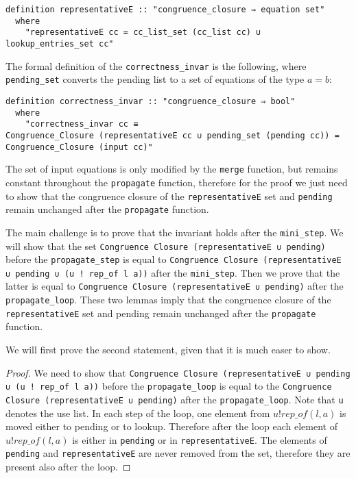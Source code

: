 \begin{lstlisting}
definition representativeE :: "congruence_closure ⇒ equation set"
  where
    "representativeE cc = cc_list_set (cc_list cc) ∪ lookup_entries_set cc"
\end{lstlisting}

The formal definition of the \lstinline|correctness_invar| is the following, where \lstinline{pending_set} converts the pending list to a set of equations of the type $a = b$:

\begin{lstlisting}
definition correctness_invar :: "congruence_closure ⇒ bool"
  where
    "correctness_invar cc ≡
Congruence_Closure (representativeE cc ∪ pending_set (pending cc)) = Congruence_Closure (input cc)"
\end{lstlisting}

The set of input equations is only modified by the \lstinline{merge} function, but remains constant throughout the \lstinline{propagate} function, therefore for the proof we just need to show that the congruence closure of the \lstinline{representativeE} set and \lstinline|pending| remain unchanged after the \lstinline{propagate} function.

The main challenge is to prove that the invariant holds after the \lstinline{mini_step}. We will show that the set \lstinline{Congruence Closure (representativeE ∪ pending)} before the \lstinline{propagate_step} is equal to \lstinline{Congruence Closure (representativeE ∪ pending ∪ (u ! rep_of l a))} after the \lstinline{mini_step}.
Then we prove that the latter is equal to \lstinline{Congruence Closure (representativeE ∪ pending)}  after the \lstinline{propagate_loop}.
These two lemmas imply that the congruence closure of the \lstinline{representativeE} set and pending remain unchanged after the \lstinline{propagate} function.

We will first prove the second statement, given that it is much easer to show.

\begin{proof}
We need to show that
\lstinline{Congruence Closure (representativeE ∪ pending ∪ (u ! rep_of l a))}
before the
\lstinline{propagate_loop} is equal to the
\lstinline{Congruence Closure (representativeE ∪ pending)}  after the \lstinline{propagate_loop}.
Note that \lstinline|u| denotes the use list.
In each step of the loop, one element from $u ! rep\_of(l, a)$ is moved either to pending or to lookup. Therefore after the loop each element of $u ! rep\_of(l, a)$ is either in \lstinline|pending| or in \lstinline|representativeE|. The elements of \lstinline|pending| and \lstinline|representativeE| are never removed from the set, therefore they are present also after the loop.
\end{proof}

